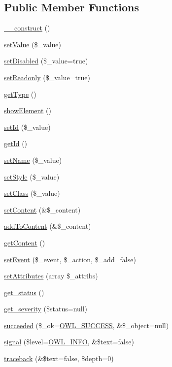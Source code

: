 \subsection*{Public Member Functions}
\begin{DoxyCompactItemize}
\item 
\hyperlink{classFormFieldPlugin_a816fc34dd6b56585e728314e6a1b73eb}{\_\-\_\-construct} ()
\item 
\hyperlink{classFormFieldPlugin_af951a690345b35e616d204cf51e8899e}{setValue} (\$\_\-value)
\item 
\hyperlink{classFormFieldPlugin_a91fae1af7cc850ae97f3f79652824b8c}{setDisabled} (\$\_\-value=true)
\item 
\hyperlink{classFormFieldPlugin_a866f1fd589c30d9e5bd1e059e4b85905}{setReadonly} (\$\_\-value=true)
\item 
\hyperlink{classFormFieldPlugin_af55e88f21054dfc3a0092c10ef0fbe40}{getType} ()
\item 
\hyperlink{classFormFieldPlugin_a3983c0e5035930d864d40e606ab3670b}{showElement} ()
\item 
\hyperlink{classBaseElement_a0c1ce3d1684ecb78960cf7a97278494e}{setId} (\$\_\-value)
\item 
\hyperlink{classBaseElement_a4a7aa583ee21af392908d7fd42fde790}{getId} ()
\item 
\hyperlink{classBaseElement_a39bafb3609d10048920c20242c2a04c5}{setName} (\$\_\-value)
\item 
\hyperlink{classBaseElement_a6b2b9ff69f6e92db82f91d9c55cda697}{setStyle} (\$\_\-value)
\item 
\hyperlink{classBaseElement_af6597b30fa9798878f6290271043dfa2}{setClass} (\$\_\-value)
\item 
\hyperlink{classBaseElement_a164a9c6e4ee68afa0ad343942ba54d28}{setContent} (\&\$\_\-content)
\item 
\hyperlink{classBaseElement_abd48eef64ca4f419f26d66a0c0419908}{addToContent} (\&\$\_\-content)
\item 
\hyperlink{classBaseElement_af8c86b93bcdcfbc415bf96c622dc5516}{getContent} ()
\item 
\hyperlink{classBaseElement_ad5789f45f16aaa144716ee8558069c31}{setEvent} (\$\_\-event, \$\_\-action, \$\_\-add=false)
\item 
\hyperlink{classBaseElement_a7d8ddd64ceb3401a7cb84548656b3709}{setAttributes} (array \$\_\-attribs)
\item 
\hyperlink{class__OWL_a99ec771fa2c5c279f80152cc09e489a8}{get\_\-status} ()
\item 
\hyperlink{class__OWL_adf9509ef96858be7bdd9414c5ef129aa}{get\_\-severity} (\$status=null)
\item 
\hyperlink{class__OWL_a53ab4d3bbb2c6a56966c339ca4b4c805}{succeeded} (\$\_\-ok=\hyperlink{owl_8severitycodes_8php_a96223f06ba27bf5cbefa6e9d702897c2}{OWL\_\-SUCCESS}, \&\$\_\-object=null)
\item 
\hyperlink{class__OWL_a51ba4a16409acf2a2f61f286939091a5}{signal} (\$level=\hyperlink{owl_8severitycodes_8php_a139328861128689f2f4def6a399d9057}{OWL\_\-INFO}, \&\$text=false)
\item 
\hyperlink{class__OWL_aa29547995d6741b7d2b90c1d4ea99a13}{traceback} (\&\$text=false, \$depth=0)
\end{DoxyCompactItemize}
